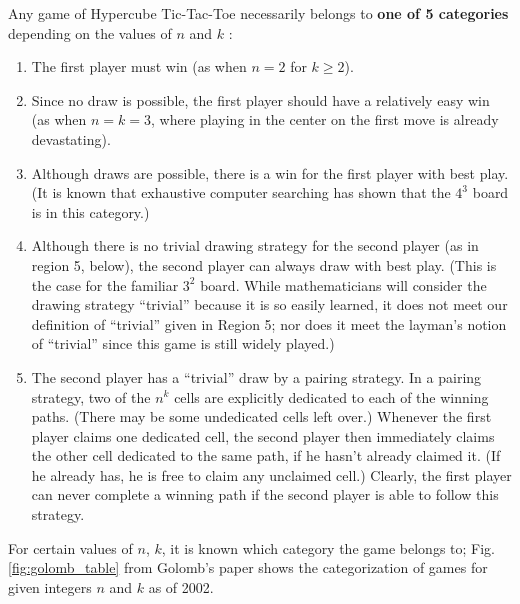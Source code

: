 \documentclass[12pt,a4paper]{article}
\begin{document}
Any game of Hypercube Tic-Tac-Toe necessarily belongs to \textbf{one of 5 categories} depending on the values of $n$ and $k$ \cite{golomb2002hypercube}:
\begin{displayquote}
	\begin{enumerate}\itemsep0pt
		\item The first player must win (as when $n=2$ for $k \geq 2$).
		\item Since no draw is possible, the first player should have a relatively easy win
		(as when $n = k = 3$, where playing in the center on the first move is already
		devastating).
		\item Although draws are possible, there is a win for the first player with best play.
		(It is known that exhaustive computer searching has shown that the $4^3$
		board is in this category.)
		\item Although there is no trivial drawing strategy for the second player (as in
		region 5, below), the second player can always draw with best play. (This is
		the case for the familiar $3^2$ board. While mathematicians will consider the
		drawing strategy “trivial” because it is so easily learned, it does not meet our
		definition of “trivial” given in Region 5; nor does it meet the layman's notion
		of “trivial” since this game is still widely played.)
		\item The second player has a “trivial” draw by a pairing strategy. In a pairing
		strategy, two of the $n^k$ cells are explicitly dedicated to each of the
		winning paths. (There may be some undedicated cells left over.)
		Whenever the first player claims one dedicated cell, the second player then
		immediately claims the other cell dedicated to the same path, if he hasn't
		already claimed it. (If he already has, he is free to claim any unclaimed cell.)
		Clearly, the first player can never complete a winning path if the second player
		is able to follow this strategy.
	\end{enumerate}
\end{displayquote}

For certain values of $n$, $k$, it is known which category the game belongs to;
Fig. \ref{fig:golomb_table} from Golomb's paper \cite{golomb2002hypercube} shows the categorization of games for given integers $n$ and $k$ as of 2002.
\end{document}
